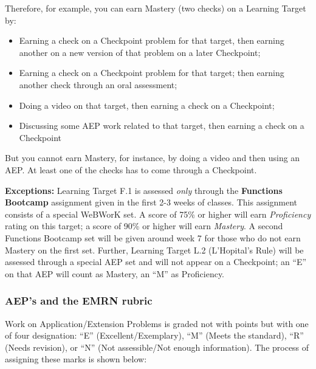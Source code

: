 \documentclass[]{article}
\providecommand{\tightlist}{%
  \setlength{\itemsep}{0pt}\setlength{\parskip}{0pt}}
\begin{document}
Therefore, for example, you can earn Mastery (two checks) on a Learning
Target by:

\begin{itemize}
\tightlist
\item
  Earning a check on a Checkpoint problem for that target, then earning
  another on a new version of that problem on a later Checkpoint;
\item
  Earning a check on a Checkpoint problem for that target; then earning
  another check through an oral assessment;
\item
  Doing a video on that target, then earning a check on a Checkpoint;
\item
  Discussing some AEP work related to that target, then earning a check
  on a Checkpoint
\end{itemize}

But you cannot earn Mastery, for instance, by doing a video and then
using an AEP. At least one of the checks has to come through a
Checkpoint.

\textbf{Exceptions:} Learning Target F.1 is assessed \emph{only} through
the \textbf{Functions Bootcamp} assignment given in the first 2-3 weeks
of classes. This assignment consists of a special WeBWorK set. A score
of 75\% or higher will earn \emph{Proficiency} rating on this target; a
score of 90\% or higher will earn \emph{Mastery}. A second Functions
Bootcamp set will be given around week 7 for those who do not earn
Mastery on the first set. Further, Learning Target L.2 (L'Hopital's
Rule) will be assessed through a special AEP set and will not appear on
a Checkpoint; an ``E'' on that AEP will count as Mastery, an ``M'' as
Proficiency.

\hypertarget{aeps-and-the-emrn-rubric}{%
\subsubsection{AEP's and the EMRN
rubric}\label{aeps-and-the-emrn-rubric}}

Work on Application/Extension Problems is graded not with points but
with one of four designation: ``E'' (Excellent/Exemplary), ``M'' (Meets
the standard), ``R'' (Needs revision), or ``N'' (Not assessible/Not
enough information). The process of assigning these marks is shown
below:
\end{document}
